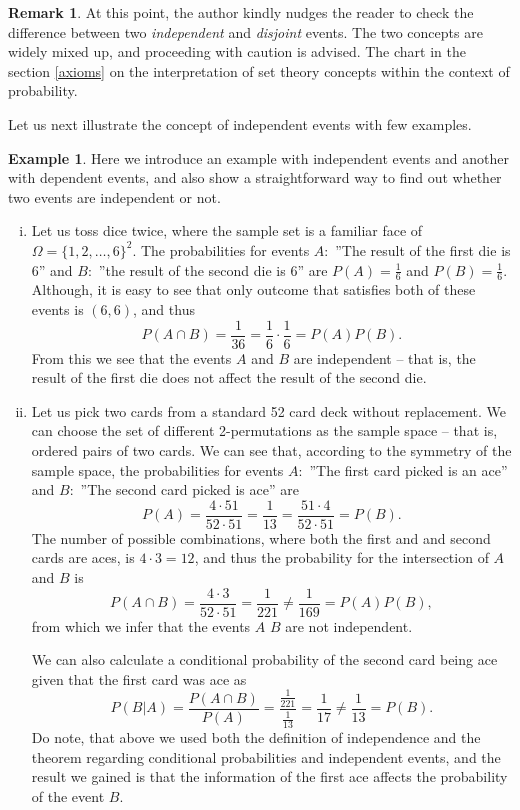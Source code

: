 \documentclass[12pt,a4paper,leqno]{report}
\theoremstyle{plain}
\theoremstyle{definition}
\newtheorem{esim}[equation]{Example}
\newtheorem{remark}[equation]{Remark}
\begin{document}
\begin{remark}
At this point, the author kindly nudges the reader to check the difference between two \emph{independent} and \emph{disjoint} events. The two concepts are widely mixed up, and proceeding with caution is advised. The chart in the section \ref{axioms} on the interpretation of set theory concepts within the context of probability.
\end{remark}

Let us next illustrate the concept of independent events with few examples.

\begin{esim}\label{esim:independent_events}
Here we introduce an example with independent events and another with dependent events, and also show a straightforward way to find out whether two events are independent or not.

\begin{enumerate}[(i)]
\item Let us toss dice twice, where the sample set is a familiar face of $\Omega = \{1,2, \dots , 6\}^2$. The probabilities for events $A:$ ''The result of the first die is 6'' and $B:$ ''the result of the second die is 6'' are $P(A) = \frac{1}{6}$ and $P(B) = \frac{1}{6}$. Although, it is easy to see that only outcome that satisfies both of these events is $(6,6)$, and thus
\[
P(A \cap B) = \frac{1}{36} = \frac{1}{6} \cdot \frac{1}{6} = P(A)P(B).
\]
From this we see that the events $A$ and $B$ are independent -- that is, the result of the first die does not affect the result of the second die.

\item Let us pick two cards from a standard 52 card deck without replacement. We can choose the set of different 2-permutations as the sample space -- that is, ordered pairs of two cards. We can see that, according to the symmetry of the sample space, the probabilities for events $A:$ ''The first card picked is an ace'' and $B:$ ''The second card picked is ace'' are
\[
P(A) = \frac{4 \cdot 51}{52 \cdot 51} = \frac{1}{13} = \frac{51 \cdot 4}{52 \cdot 51} = P(B).
\]
The number of possible combinations, where both the first and and second cards are aces, is $4 \cdot 3 = 12$, and thus the probability for the intersection of $A$ and $B$ is 
\[
P(A \cap B) = \frac{4 \cdot 3}{52 \cdot 51} = \frac{1}{221} \neq \frac{1}{169}= P(A)P(B),
\] 
from which we infer that the events $A$ $B$ are not independent.

We can also calculate a conditional probability of the second card being ace given that the first card was ace as
\[
P(B|A) = \frac{P(A \cap B)}{P(A)} = \frac{\frac{1}{221}}{\frac{1}{13}} = \frac{1}{17} \neq \frac{1}{13} = P(B).
\]
Do note, that above we used both the definition of independence and the theorem regarding conditional probabilities and independent events, and the result we gained is that the information of the first ace affects the probability of the event $B$.
\end{enumerate}
\end{esim}
\end{document}

